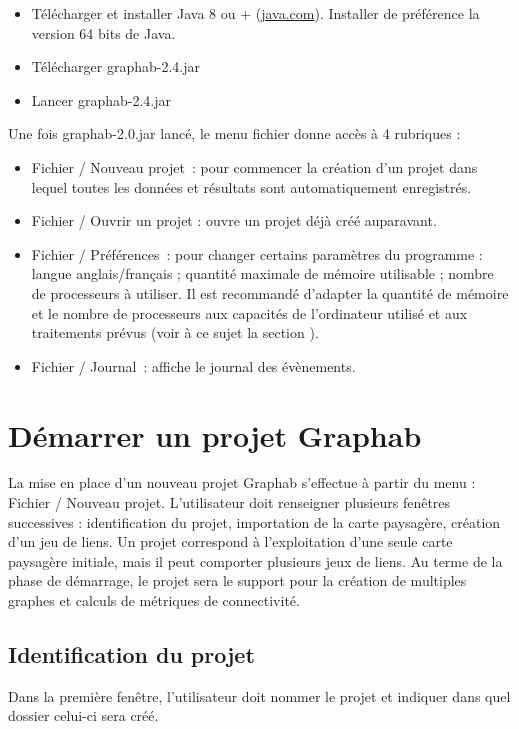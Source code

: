 \documentclass{article}
\begin{document}
\begin{itemize}
	\item Télécharger et installer Java 8 ou + (\href{http://www.java.com}{java.com}). Installer de préférence la version 64 bits de Java.
	\item Télécharger graphab-2.4.jar
	\item Lancer graphab-2.4.jar
\end{itemize}

Une fois graphab-2.0.jar lancé, le menu fichier donne accès à 4 rubriques : 
\begin{itemize}
	\item Fichier / Nouveau projet~: pour commencer la création d’un projet dans lequel toutes les données et résultats sont automatiquement enregistrés.
	\item Fichier / Ouvrir un projet : ouvre un projet déjà créé auparavant.
	\item Fichier / Préférences~: pour changer certains paramètres du programme : langue anglais/français ; quantité maximale de mémoire utilisable ; nombre de processeurs à utiliser. Il est recommandé d’adapter la quantité de mémoire et le nombre de processeurs aux capacités de l’ordinateur utilisé et aux traitements prévus (voir à ce sujet la section ).  
	\item Fichier / Journal~: affiche le journal des évènements.
\end{itemize}

\section{Démarrer un projet Graphab}

La mise en place d’un nouveau projet Graphab s’effectue à partir du menu : Fichier / Nouveau projet. L’utilisateur doit renseigner plusieurs fenêtres successives : identification du projet, importation de la carte paysagère, création d’un jeu de liens. Un projet correspond à l’exploitation d’une seule carte paysagère initiale, mais il peut comporter plusieurs jeux de liens. Au terme de la phase de démarrage, le projet sera le support pour la création de multiples graphes et calculs de métriques de connectivité.

\subsection{Identification du projet}

Dans la première fenêtre, l’utilisateur doit nommer le projet et indiquer dans quel dossier celui-ci sera créé.
\end{document}
